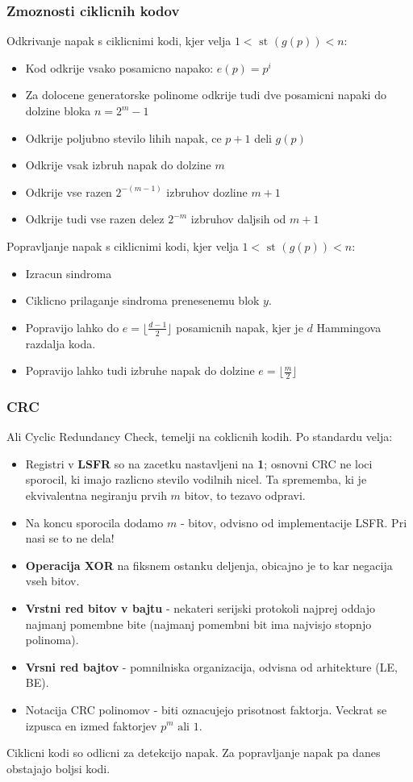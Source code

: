 \documentclass{article}
\begin{document}
\begin{multicols}{3}
\subsubsection{Zmoznosti ciklicnih kodov}
Odkrivanje napak s ciklicnimi kodi, kjer velja $1 < \text{ st }(g(p)) < n$:
\begin{itemize}
    \item Kod odkrije vsako posamicno napako: $e(p) = p^i$
    \item Za dolocene generatorske polinome odkrije tudi dve posamicni napaki do dolzine bloka $n = 2^m -1$
    \item Odkrije poljubno stevilo lihih napak, ce $p + 1$ deli $g(p)$
    \item Odkrije vsak izbruh napak do dolzine $m$
    \item Odkrije vse razen $2^{-(m-1)}$ izbruhov dozline $m + 1$
    \item Odkrije tudi vse razen delez $2^{-m}$ izbruhov daljsih od $m + 1$
\end{itemize}
Popravljanje napak s ciklicnimi kodi, kjer velja $1 < \text{ st }(g(p)) < n$:
\begin{itemize}
    \item Izracun sindroma
    \item Ciklicno prilaganje sindroma prenesenemu blok $y$.
    \item Popravijo lahko do $e = \lfloor \frac{d-1}{2} \rfloor$ posamicnih napak, kjer je
        $d$ Hammingova razdalja koda.
    \item Popravijo lahko tudi izbruhe napak do dolzine $e = \lfloor \frac{m}{2} \rfloor$
\end{itemize}

\subsubsection{CRC}
Ali Cyclic Redundancy Check, temelji na coklicnih kodih.
Po standardu velja:
\begin{itemize}
    \item Registri v \textbf{LSFR} so na zacetku nastavljeni na \textbf{1}; osnovni CRC ne loci sporocil,
        ki imajo razlicno stevilo vodilnih nicel. Ta sprememba, ki je ekvivalentna negiranju prvih $m$ bitov,
        to tezavo odpravi.
    \item Na koncu sporocila dodamo $m$ - bitov, odvisno od implementacije LSFR. Pri nasi se to ne dela!
    \item \textbf{Operacija XOR} na fiksnem ostanku deljenja, obicajno je to kar negacija vseh bitov.
    \item \textbf{Vrstni red bitov v bajtu} - nekateri serijski protokoli najprej oddajo najmanj pomembne bite
        (najmanj pomembni bit ima najvisjo stopnjo polinoma).
    \item \textbf{Vrsni red bajtov} - pomnilniska organizacija, odvisna od arhitekture (LE, BE).
    \item Notacija CRC polinomov - biti oznacujejo prisotnost faktorja. Veckrat se izpusca en izmed faktorjev $p^m \text{ ali } 1$.
\end{itemize}
Ciklicni kodi so odlicni za detekcijo napak. Za popravljanje napak pa danes obstajajo boljsi kodi.


\end{multicols}
\end{document}

